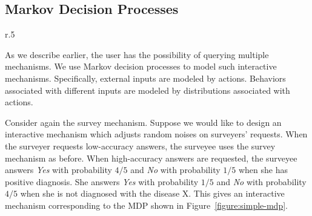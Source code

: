 \subsection{Markov Decision Processes}

\begin{wrapfigure}{r}{.5\columnwidth}
  \centering
    \caption{Markov Decision Process}
    \label{figure:simple-mdp}
\end{wrapfigure}


As we describe earlier, the user has the possibility of querying multiple mechanisms.
We use Markov decision processes to model such
interactive mechanisms. Specifically, external inputs are modeled by
actions. Behaviors associated with different inputs are modeled by
distributions associated with actions.


Consider again the survey mechanism. Suppose we would like to design
an interactive mechanism which adjusts random noises on surveyers'
requests. When the surveyer requests low-accuracy answers, the
surveyee uses the survey mechanism as before. When high-accuracy
answers are requested, the surveyee answers \textit{Yes} with
probability $4/5$ and \textit{No} with probability $1/5$ when she has
positive diagnosis. She answers \textit{Yes} with probability $1/5$
and \textit{No} with probability $4/5$ when she is not
diagnosed with the disease X. This gives an interactive mechanism
corresponding to the MDP shown in
Figure~\ref{figure:simple-mdp}.

